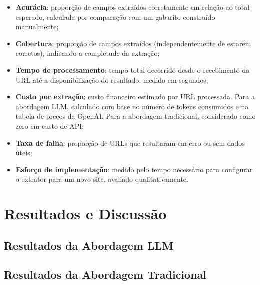 \documentclass[tcc,capa]{texifsul}
\begin{document}
\begin{itemize}
    \item \textbf{Acurácia}: proporção de campos extraídos corretamente em relação ao total esperado, calculada por comparação com um gabarito construído manualmente;
    \item \textbf{Cobertura}: proporção de campos extraídos (independentemente de estarem corretos), indicando a completude da extração;
    \item \textbf{Tempo de processamento}: tempo total decorrido desde o recebimento da URL até a disponibilização do resultado, medido em segundos;
    \item \textbf{Custo por extração}: custo financeiro estimado por URL processada. Para a abordagem LLM, calculado com base no número de tokens consumidos e na tabela de preços da OpenAI. Para a abordagem tradicional, considerado como zero em custo de API;
    \item \textbf{Taxa de falha}: proporção de URLs que resultaram em erro ou sem dados úteis;
    \item \textbf{Esforço de implementação}: medido pelo tempo necessário para configurar o extrator para um novo site, avaliado qualitativamente.
\end{itemize}

\chapter{Resultados e Discussão}
\label{cap:resultados}


\section{Resultados da Abordagem LLM}


\section{Resultados da Abordagem Tradicional}

\end{document}
